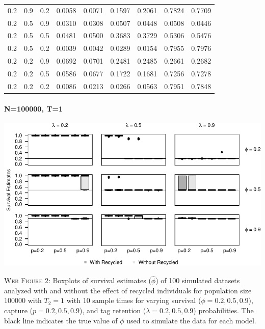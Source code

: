 \documentclass[]{article}
\let\oldparagraph\paragraph
\renewcommand{\paragraph}[1]{\oldparagraph{#1}\mbox{}}
\begin{document}
\begin{table}[ht]
{\begin{tabular}{rrrrrrrrr}
  0.2 & 0.9 & 0.2 & 0.0058 & 0.0071 & 0.1597 & 0.2061 & 0.7824 & 0.7709 \\ 
  0.2 & 0.5 & 0.9 & 0.0310 & 0.0308 & 0.0507 & 0.0448 & 0.0508 & 0.0446 \\ 
  0.2 & 0.5 & 0.5 & 0.0481 & 0.0500 & 0.3683 & 0.3729 & 0.5306 & 0.5476 \\ 
  0.2 & 0.5 & 0.2 & 0.0039 & 0.0042 & 0.0289 & 0.0154 & 0.7955 & 0.7976 \\ 
  0.2 & 0.2 & 0.9 & 0.0692 & 0.0701 & 0.2481 & 0.2485 & 0.2661 & 0.2682 \\ 
  0.2 & 0.2 & 0.5 & 0.0586 & 0.0677 & 0.1722 & 0.1681 & 0.7256 & 0.7278 \\ 
  0.2 & 0.2 & 0.2 & 0.0086 & 0.0213 & 0.0266 & 0.0563 & 0.7951 & 0.7848 \\ 
   \hline
\end{tabular}
}
\endgroup
\end{table}

\newpage 

\paragraph{N=100000, T=1}\label{n100000-t1}

\includegraphics{Appendix_BW_files/figure-latex/figure2_survival_GJSTL2-1.pdf}

\textsc{Web Figure 2:} Boxplots of survival estimates (\(\hat{\phi}\))
of 100 simulated datasets analyzed with and without the effect of
recycled individuals for population size \(100000\) with \(T_2=1\) with
10 sample times for varying survival (\(\phi=0.2,0.5,0.9\)), capture
(\(p=0.2,0.5,0.9\)), and tag retention (\(\lambda=0.2,0.5,0.9\))
probabilities. The black line indicates the true value of \(\phi\) used
to simulate the data for each model.
\end{document}
